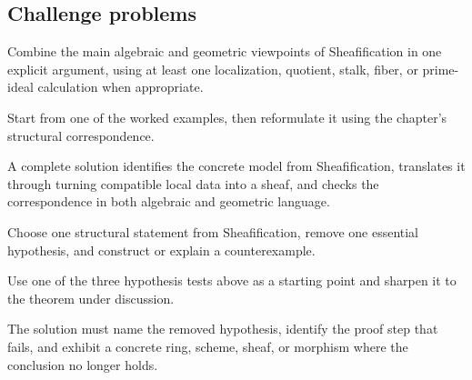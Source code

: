 \subsection*{Challenge problems}

\begin{exercise}\label{exr:vi14-expand-15}
Combine the main algebraic and geometric viewpoints of Sheafification in one explicit argument, using at least one localization, quotient, stalk, fiber, or prime-ideal calculation when appropriate.
\end{exercise}
\begin{hint}
Start from one of the worked examples, then reformulate it using the chapter's structural correspondence.
\end{hint}
\begin{solution}
A complete solution identifies the concrete model from Sheafification, translates it through turning compatible local data into a sheaf, and checks the correspondence in both algebraic and geometric language.
\end{solution}

\begin{exercise}\label{exr:vi14-expand-16}
Choose one structural statement from Sheafification, remove one essential hypothesis, and construct or explain a counterexample.
\end{exercise}
\begin{hint}
Use one of the three hypothesis tests above as a starting point and sharpen it to the theorem under discussion.
\end{hint}
\begin{solution}
The solution must name the removed hypothesis, identify the proof step that fails, and exhibit a concrete ring, scheme, sheaf, or morphism where the conclusion no longer holds.
\end{solution}

